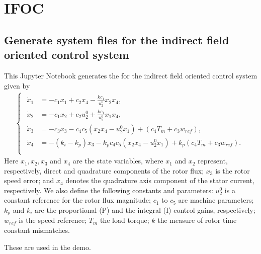 \documentclass[letterpaper,10pt,english]{jupyterBook}
\begin{document}
\noindent{}


\part{IFOC}


\chapter{Generate system files for the indirect field oriented control system}
\label{\detokenize{IFOCGenSym:generate-system-files-for-the-indirect-field-oriented-control-system}}\label{\detokenize{IFOCGenSym::doc}}
\sphinxAtStartPar
This Jupyter Notebook generates the  for the indirect field oriented control system given by
\begin{equation*}
\begin{split}
\begin{cases}
\begin{aligned}
\dot x_1 &= -c_1 x_1 + c_2 x_4 - \frac{k c_1}{u_2^0} x_2 x_4, \\
\dot x_2 &= -c_1 x_2 + c_2 u_2^0 + \frac{k c_1}{u_2^0} x_1 x_4, \\
\dot x_3 &= -c_3 x_3 - c_4 c_5 (x_2x_4 - u_2^0 x_1) + (c_4 T_m + c_3 w_{ref}), \\
\dot x_4 &= -(k_i-k_p)x_3 - k_p c_4 c_5 ( x_2 x_4 - u_2^0 x_1) + k_p (c_4 T_m + c_3 w_{ref}). \\
\end{aligned}
\end{cases}
\end{split}
\end{equation*}
\sphinxAtStartPar
Here \(x_1 , x_2 , x_3\) and \(x_4\) are the state variables, where \(x_1\) and \(x_2\)
represent, respectively, direct and quadrature components of the rotor ﬂux;
\(x_3\) is the rotor speed error; and \(x_4\) denotes the quadrature axis component
of the stator current, respectively.  We also deﬁne the following constants and
parameters: \(u_2^0\) is a constant reference for the rotor flux magnitude; \(c_1\)
to \(c_5\) are machine parameters; \(k_p\) and \(k_i\) are the proportional (P) and
the integral (I) control gains, respectively; \(w_{ref}\) is the speed reference;
\(T_m\) the load torque; \(k\) the measure of rotor time constant mismatches.

\sphinxAtStartPar
These are used in the {\hyperref[\detokenize{IFOC::doc}]{}} demo.
\end{document}
